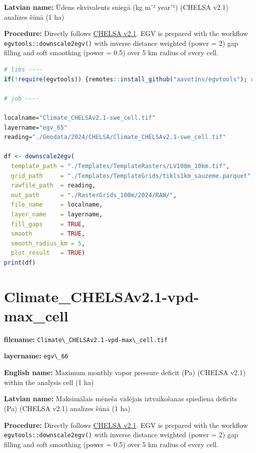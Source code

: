 \documentclass[
]{book}
\newcommand{\passthrough}[1]{#1}
\begin{document}
\textbf{Latvian name:} Ūdens ekvivalents sniegā (kg m⁻² year⁻¹) (CHELSA v2.1) analīzes šūnā (1 ha)

\textbf{Procedure:} Directly follows \hyperref[Ch04.11]{CHELSA v2.1}. EGV is prepared with the
workflow \passthrough{\lstinline!egvtools::downscale2egv()!} with inverse distance weighted (power = 2)
gap filling and soft smoothing (power = 0.5) over 5 km radius of every cell.

\begin{lstlisting}[language=R]
# libs ----
if(!require(egvtools)) {remotes::install_github("aavotins/egvtools"); require(egvtools)}

# job ----

localname="Climate_CHELSAv2.1-swe_cell.tif"
layername="egv_65"
reading="./Geodata/2024/CHELSA/Climate_CHELSAv2.1-swe_cell.tif"

df <- downscale2egv(
  template_path = "./Templates/TemplateRasters/LV100m_10km.tif",
  grid_path     = "./Templates/TemplateGrids/tikls1km_sauzeme.parquet",
  rawfile_path  = reading,
  out_path      = "./RasterGrids_100m/2024/RAW/",
  file_name     = localname,
  layer_name    = layername,
  fill_gaps     = TRUE,
  smooth        = TRUE,
  smooth_radius_km = 5,
  plot_result   = TRUE)
print(df)
\end{lstlisting}

\section{Climate\_CHELSAv2.1-vpd-max\_cell}\label{ch06.066}

\textbf{filename:} \passthrough{\lstinline!Climate\_CHELSAv2.1-vpd-max\_cell.tif!}

\textbf{layername:} \passthrough{\lstinline!egv\_66!}

\textbf{English name:} Maximum monthly vapor pressure deficit (Pa) (CHELSA v2.1) within the analysis cell (1 ha)

\textbf{Latvian name:} Maksimālais mēneša vidējais iztvaikošanas spiediena deficīts (Pa) (CHELSA v2.1) analīzes šūnā (1 ha)

\textbf{Procedure:} Directly follows \hyperref[Ch04.11]{CHELSA v2.1}. EGV is prepared with the
workflow \passthrough{\lstinline!egvtools::downscale2egv()!} with inverse distance weighted (power = 2)
gap filling and soft smoothing (power = 0.5) over 5 km radius of every cell.
\end{document}
